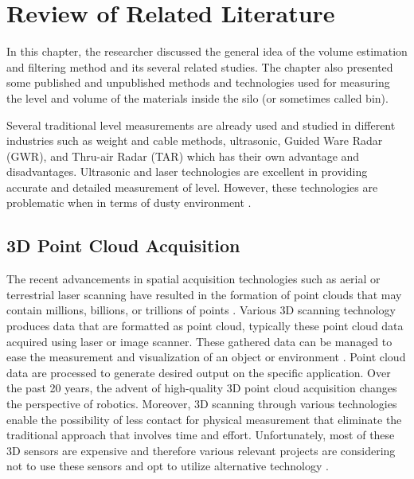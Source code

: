 \renewcommand{\thechapter}{\Roman{chapter}}
\chapter{Review of Related Literature}
\renewcommand{\thechapter}{\arabic{chapter}}
\label{ch:rrl}
\thispagestyle{empty}

In this chapter, the researcher discussed the general idea of the volume estimation and filtering method and its several related studies. The chapter also presented some published and unpublished methods and technologies used for measuring the level and volume of the materials inside the silo (or sometimes called bin). 

Several traditional level measurements are already used and studied in different industries such as weight and cable methods, ultrasonic, Guided Ware Radar (GWR), and Thru-air Radar (TAR) which has their own advantage and disadvantages. Ultrasonic and laser technologies are excellent in providing accurate and detailed measurement of level. However, these technologies are problematic when in terms of dusty environment \citep{duysak2020}.

\section{3D Point Cloud Acquisition}
\label{rrl:sec:3D Point Cloud acquisition}
The recent advancements in spatial acquisition technologies such as aerial or terrestrial laser scanning have resulted in the formation of point clouds that may contain millions, billions, or trillions of points \citep{jaboyedoff2012}. Various 3D scanning technology produces data that are formatted as point cloud, typically these point cloud data acquired using laser or image scanner. These gathered data can be managed to ease the measurement and visualization of an object or environment \citep{chua2017}. Point cloud data are processed to generate desired output on the specific application. Over the past 20 years, the advent of high-quality 3D point cloud acquisition changes the perspective of robotics. Moreover, 3D scanning through various technologies enable the possibility of less contact for physical measurement that eliminate the traditional approach that involves time and effort. Unfortunately, most of these 3D sensors are expensive and therefore various relevant projects are considering not to use these sensors and opt to utilize alternative technology \citep{rusu2011}. 

